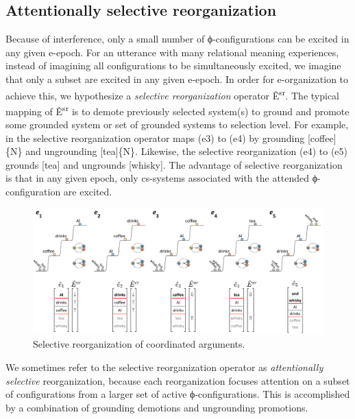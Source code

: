 \subsection{Attentionally selective reorganization}

Because of interference, only a small number of ϕ-configurations can be excited in any given e-epoch. For an utterance with many relational meaning experiences, instead of imagining all configurations to be simultaneously excited, we imagine that only a subset are excited in any given e-epoch. In order for e-organization to achieve this, we hypothesize a \textit{selective reorganization} operator Ê\textsuperscript{sr}. The typical mapping of  Ê\textsuperscript{sr} is to demote previously selected system(s) to ground and promote some grounded system or set of grounded systems to selection level. For example, in {} the selective reorganization operator maps (e3) to (e4) by grounding [coffee]\{N\} and ungrounding [tea]\{N\}. Likewise, the selective reorganization (e4) to (e5) grounds [tea] and ungrounds [whisky]. The advantage of selective reorganization is that in any given epoch, only cs-systems associated with the attended ϕ-configuration are excited.

  
\begin{figure}
\includegraphics[width=\textwidth]{figures/Tilsen-img99.png}
\caption{Selective reorganization of coordinated arguments.}
\label{fig:4:49}
\end{figure}
   

  We sometimes refer to the selective reorganization operator as \textit{attentionally selective} reorganization, because each reorganization focuses attention on a subset of configurations from a larger set of active ϕ-configurations. This is accomplished by a combination of grounding demotions and ungrounding promotions.

